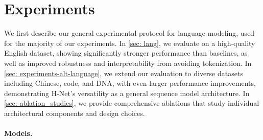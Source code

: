 \section{Experiments}
\label{sec: experiments}



We first describe our general experimental protocol for language modeling,  used for the majority of our experiments.
In \cref{sec: lang}, we evaluate on a high-quality English dataset, showing significantly stronger performance than baselines, as well as improved robustness and interpretability from avoiding tokenization.
In \cref{sec: experiments-alt-language}, we extend our evaluation to diverse datasets including Chinese, code, and DNA, with even larger performance improvements, demonstrating H-Net's versatility as a general sequence model architecture.
In \cref{sec: ablation_studies}, we provide comprehensive ablations that study individual architectural components and design choices.

\paragraph{Models.}

